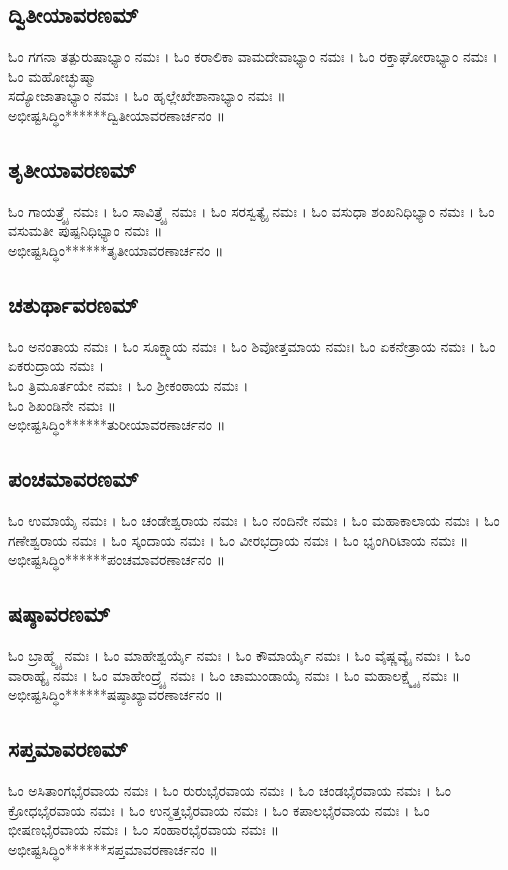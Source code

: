 \subsection{ದ್ವಿತೀಯಾವರಣಮ್}
ಓಂ ಗಗನಾ ತತ್ಪುರುಷಾಭ್ಯಾಂ ನಮಃ । ಓಂ  ಕರಾಲಿಕಾ ವಾಮದೇವಾಭ್ಯಾಂ ನಮಃ । ಓಂ  ರಕ್ತಾಘೋರಾಭ್ಯಾಂ ನಮಃ । ಓಂ  ಮಹೋಚ್ಛುಷ್ಮಾ \\ಸದ್ಯೋಜಾತಾಭ್ಯಾಂ ನಮಃ । ಓಂ  ಹೃಲ್ಲೇಖೇಶಾನಾಭ್ಯಾಂ ನಮಃ ॥\\
ಅಭೀಷ್ಟಸಿದ್ಧಿಂ******ದ್ವಿತೀಯಾವರಣಾರ್ಚನಂ ॥
\subsection{ತೃತೀಯಾವರಣಮ್}
ಓಂ ಗಾಯತ್ರ್ಯೈ ನಮಃ । ಓಂ  ಸಾವಿತ್ರ್ಯೈ ನಮಃ । ಓಂ ಸರಸ್ವತ್ಯೈ ನಮಃ । ಓಂ  ವಸುಧಾ ಶಂಖನಿಧಿಭ್ಯಾಂ ನಮಃ । ಓಂ  ವಸುಮತೀ ಪುಷ್ಪನಿಧಿಭ್ಯಾಂ ನಮಃ ॥\\
ಅಭೀಷ್ಟಸಿದ್ಧಿಂ******ತೃತೀಯಾವರಣಾರ್ಚನಂ ॥
\subsection{ಚತುರ್ಥಾವರಣಮ್}
ಓಂ ಅನಂತಾಯ ನಮಃ । ಓಂ  ಸೂಕ್ಷ್ಮಾಯ ನಮಃ । ಓಂ  ಶಿವೋತ್ತಮಾಯ ನಮಃ। ಓಂ  ಏಕನೇತ್ರಾಯ ನಮಃ । ಓಂ  ಏಕರುದ್ರಾಯ ನಮಃ । \\ಓಂ   ತ್ರಿಮೂರ್ತಯೇ ನಮಃ । ಓಂ  ಶ್ರೀಕಂಠಾಯ ನಮಃ ।\\ ಓಂ  ಶಿಖಂಡಿನೇ ನಮಃ ॥\\
ಅಭೀಷ್ಟಸಿದ್ಧಿಂ******ತುರೀಯಾವರಣಾರ್ಚನಂ ॥
\subsection{ಪಂಚಮಾವರಣಮ್}
ಓಂ ಉಮಾಯೈ ನಮಃ । ಓಂ  ಚಂಡೇಶ್ವರಾಯ ನಮಃ । ಓಂ  ನಂದಿನೇ ನಮಃ । ಓಂ  ಮಹಾಕಾಲಾಯ ನಮಃ । ಓಂ  ಗಣೇಶ್ವರಾಯ ನಮಃ । ಓಂ  ಸ್ಕಂದಾಯ ನಮಃ । ಓಂ  ವೀರಭದ್ರಾಯ ನಮಃ । ಓಂ  ಭೃಂಗಿರಿಟಾಯ ನಮಃ ॥\\
ಅಭೀಷ್ಟಸಿದ್ಧಿಂ******ಪಂಚಮಾವರಣಾರ್ಚನಂ ॥
\subsection{ಷಷ್ಠಾವರಣಮ್}
ಓಂ ಬ್ರಾಹ್ಮ್ಯೈ ನಮಃ । ಓಂ ಮಾಹೇಶ್ವರ್ಯೈ ನಮಃ । ಓಂ ಕೌಮಾರ್ಯೈ ನಮಃ । ಓಂ ವೈಷ್ಣವ್ಯೈ ನಮಃ । ಓಂ ವಾರಾಹ್ಯೈ ನಮಃ । ಓಂ ಮಾಹೇಂದ್ರ್ಯೈ ನಮಃ । ಓಂ ಚಾಮುಂಡಾಯೈ ನಮಃ । ಓಂ ಮಹಾಲಕ್ಷ್ಮ್ಯೈ ನಮಃ ॥\\
ಅಭೀಷ್ಟಸಿದ್ಧಿಂ******ಷಷ್ಠಾಖ್ಯಾವರಣಾರ್ಚನಂ ॥
\newpage
\subsection{ಸಪ್ತಮಾವರಣಮ್}
ಓಂ ಅಸಿತಾಂಗಭೈರವಾಯ ನಮಃ । ಓಂ ರುರುಭೈರವಾಯ ನಮಃ । ಓಂ ಚಂಡಭೈರವಾಯ ನಮಃ । ಓಂ ಕ್ರೋಧಭೈರವಾಯ ನಮಃ । ಓಂ ಉನ್ಮತ್ತಭೈರವಾಯ ನಮಃ । ಓಂ ಕಪಾಲಭೈರವಾಯ ನಮಃ । ಓಂ ಭೀಷಣಭೈರವಾಯ ನಮಃ । ಓಂ ಸಂಹಾರಭೈರವಾಯ ನಮಃ ॥\\%
ಅಭೀಷ್ಟಸಿದ್ಧಿಂ******ಸಪ್ತಮಾವರಣಾರ್ಚನಂ ॥
